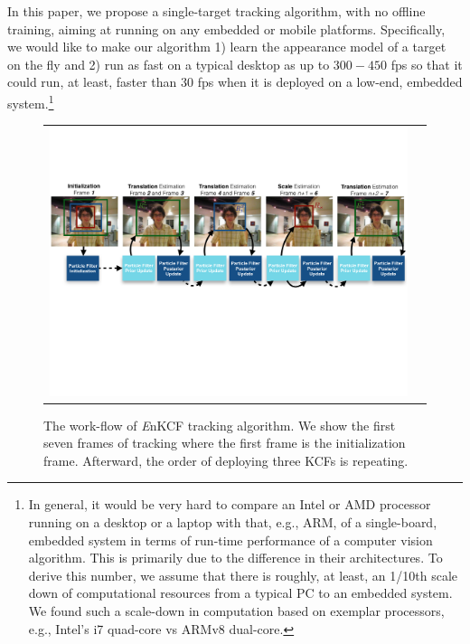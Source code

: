 \documentclass[10pt,twocolumn,letterpaper]{article}
\begin{document}
In this paper, we propose a single-target tracking algorithm, with no
offline training, aiming at running on any embedded or mobile
platforms. Specifically, we would like to make our algorithm 1) learn
the appearance model of a target on the fly and 2) run as fast on a
typical desktop as up to $300-450$ fps so that it could run, at least,
faster than 30 fps when it is deployed on a low-end, embedded
system.\footnote{In general, it would be very hard to compare an Intel
  or AMD processor running on a desktop or a laptop with that, e.g.,
  ARM, of a single-board, embedded system in terms of run-time
  performance of a computer vision algorithm. This is primarily due to
  the difference in their architectures. To derive this number, we
  assume that there is roughly, at least, an 1/10th scale down of
  computational resources from a typical PC to an embedded system. We
  found such a scale-down in computation based on exemplar processors,
  e.g., Intel's i7 quad-core vs ARMv8 dual-core.}

\begin{figure}[!h]
\centering
\begin{tabular}{cc}
\includegraphics[width=14.00cm]{./figures/Workflow_MKCF+PF.pdf}\\
\end{tabular}
\caption{The work-flow of {\it E}nKCF tracking algorithm. We show the
  first seven frames of tracking where the first frame is the
  initialization frame. Afterward, the order of deploying three KCFs
  is repeating.}
\label{Workflows}
\end{figure}
\end{document}
